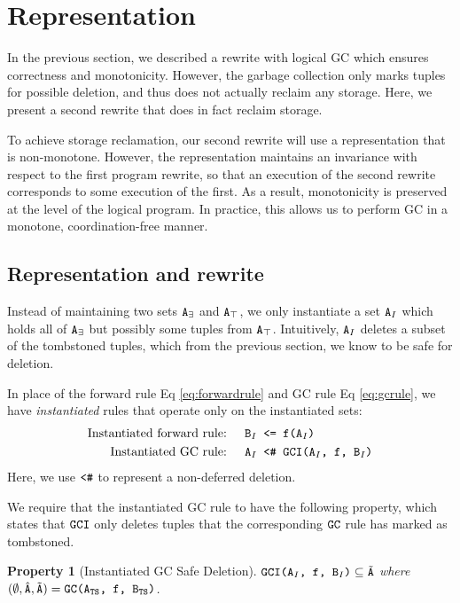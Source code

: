\documentclass[10pt]{proc}
\newtheorem{property}{Property}[section]
\renewcommand{\tt}[1]{\ifmmode\text{\texttt{#1}}\else\texttt{#1}\fi}
\begin{document}
\section{Representation}
In the previous section, we described a rewrite with logical GC which ensures correctness and monotonicity.
However, the garbage collection only marks tuples for possible deletion, and thus does not actually reclaim any storage.
Here, we present a second rewrite that does in fact reclaim storage.

To achieve storage reclamation, our second rewrite will use a representation that is non-monotone.
However, the representation maintains an invariance with respect to the first program rewrite, so that an execution of the second rewrite corresponds to some execution of the first.
As a result, monotonicity is preserved at the level of the logical program.
In practice, this allows us to perform GC in a monotone, coordination-free manner.

\subsection{Representation and rewrite}
Instead of maintaining two sets $\tt{A}_\exists$ and $\tt{A}_\top$, we only instantiate a set $\tt{A}_I$ which holds all of $\tt{A}_\exists$ but possibly some tuples from $\tt{A}_\top$.
Intuitively, $\tt{A}_I$ deletes a subset of the tombstoned tuples, which from the previous section, we know to be safe for deletion.

In place of the forward rule Eq \eqref{eq:forwardrule} and GC rule Eq \eqref{eq:gcrule}, we have \textit{instantiated} rules that operate only on the instantiated sets: 
\begin{align}
\text{Instantiated forward rule: } && \tt{B}_I &\tt{ <= f(A$_I$)}\label{eq:instantiatedforwardrule}\\
\text{Instantiated GC rule: } && \tt{A}_I &\tt{ <\# GCI(A$_I$, f, B$_I$)}\label{eq:instantiatedgcrule}
\end{align}
Here, we use $\tt{<\#}$ to represent a non-deferred deletion.

We require that the instantiated GC rule to have the following property, which states that $\tt{GCI}$ only deletes tuples that the corresponding $\tt{GC}$ rule has marked as tombstoned.
\begin{property}[Instantiated GC Safe Deletion]\label{prp:gcisafe}
$\tt{GCI(A$_I$, f, B$_I$)} \subseteq \tilde{\tt{A}}$ where $(\emptyset, \hat{\tt{A}}, \tilde{\tt{A}}) = \tt{GC(A$_\text{TS}$, f, B$_\text{TS}$)}$.
\end{property}
\end{document}
